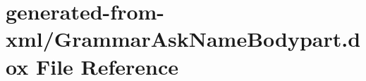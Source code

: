 \hypertarget{GrammarAskNameBodypart_8dox}{}\section{generated-\/from-\/xml/\+Grammar\+Ask\+Name\+Bodypart.dox File Reference}
\label{GrammarAskNameBodypart_8dox}
